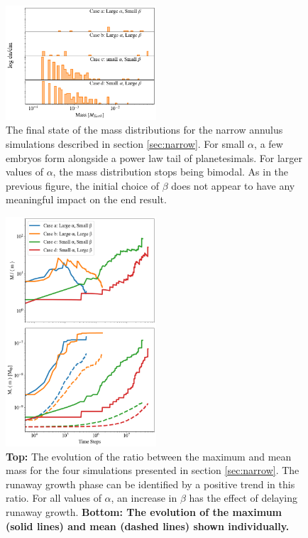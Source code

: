\documentclass[twocolumn,linenumbers]{aastex63}
\begin{document}
\begin{figure}
\begin{center}
    \includegraphics[width=0.5\textwidth]{figures/alpha_beta_mass.png}
    \caption{The final state of the mass distributions for the
      narrow annulus simulations described in section \ref{sec:narrow}. For small
      $\alpha$, a few embryos form alongside a power law tail of
      planetesimals. For larger values of $\alpha$, the mass distribution stops being bimodal. 
      As in the previous figure, the initial choice of $\beta$ does not appear to have any meaningful impact on the end result.
      \label{fig:alpha_beta_mass}}
\end{center}
\end{figure}

\begin{figure}
\begin{center}
    \includegraphics[width=0.5\textwidth]{figures/alpha_beta_evo.png}
    \caption{\textbf{Top:} The evolution of the ratio between the maximum and mean mass for the four simulations presented
    in section \ref{sec:narrow}. The runaway growth phase can be identified by a positive trend in this ratio. For all values of 
    $\alpha$, an increase in $\beta$ has the effect of delaying runaway growth. \textbf{Bottom: The evolution of the maximum
    (solid lines) and mean (dashed lines) shown individually.}\label{fig:alpha_beta_evo}}
\end{center}
\end{figure}
\end{document}
